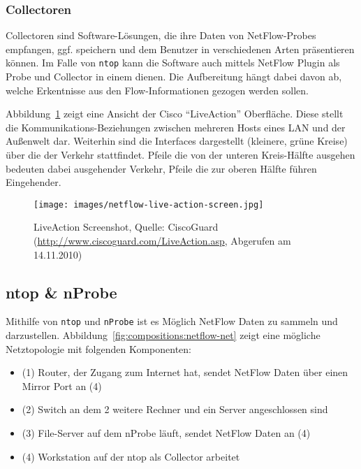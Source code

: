 \subsubsection{Collectoren}

Collectoren sind Software-Lösungen, die ihre Daten von NetFlow-Probes empfangen,
ggf. speichern und dem Benutzer in verschiedenen Arten präsentieren können. Im
Falle von \texttt{ntop} kann die Software  auch mittels NetFlow Plugin als Probe und
Collector in einem dienen. Die Aufbereitung hängt dabei davon ab, welche
Erkentnisse aus den Flow-Informationen gezogen werden sollen.

Abbildung~\ref{fig:compositions:netflow-live-action} zeigt eine Ansicht der
Cisco \enquote{LiveAction} Oberfläche. Diese stellt die Kommunikations-Beziehungen
zwischen mehreren Hosts eines LAN und der Außenwelt dar. Weiterhin sind die
Interfaces dargestellt (kleinere, grüne Kreise)  über die der Verkehr
stattfindet. Pfeile die von der unteren Kreis-Hälfte ausgehen bedeuten dabei
ausgehender Verkehr, Pfeile die zur oberen Hälfte führen Eingehender.

\begin{figure}
  \begin{center}
    \texttt{[image: images/netflow-live-action-screen.jpg]}
    \caption{LiveAction Screenshot, Quelle: CiscoGuard
    \label{fig:compositions:netflow-live-action}
(\url{http://www.ciscoguard.com/LiveAction.asp}, Abgerufen am 14.11.2010)}
  \end{center}
\end{figure}

\subsection{ntop \& nProbe}

Mithilfe von \texttt{ntop} und \texttt{nProbe} ist es Möglich NetFlow Daten zu sammeln und
darzustellen. Abbildung~\ref{fig:compositions:netflow-net} zeigt eine mögliche
Netztopologie mit folgenden Komponenten:

\begin{itemize}
  \item (1) Router, der Zugang zum Internet hat, sendet NetFlow Daten über einen
Mirror Port an (4)
  \item (2) Switch an dem 2 weitere Rechner und ein Server angeschlossen
sind
  \item (3) File-Server auf dem nProbe läuft, sendet NetFlow Daten an (4)
  \item (4) Workstation auf der ntop als Collector arbeitet
\end{itemize}

